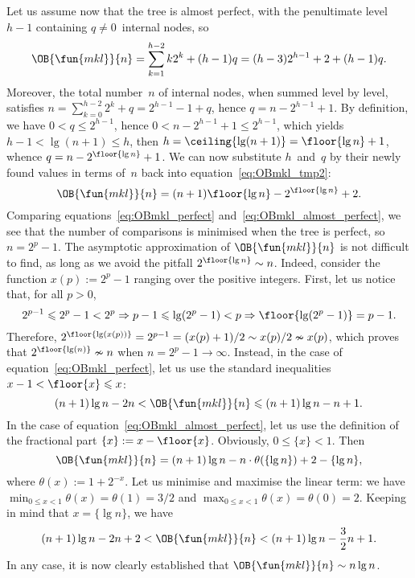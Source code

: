 Let us assume now that the tree is almost perfect, with the
penultimate level \(h-1\) containing \(q \neq 0\)~internal nodes, so
\begin{equation}
\OB{\fun{mkl}}{n} = \sum_{k=1}^{h-2}k2^k + (h-1)q
= (h-3)2^{h-1} + 2 + (h-1)q.
\label{eq:OBmkl_tmp2}
\end{equation}
Moreover, the total number~\(n\) of internal nodes, when summed level
by level, satisfies \(n = \sum_{k=0}^{h-2}2^k + q = 2^{h-1} - 1 + q\),
hence \(q = n - 2^{h-1} + 1\). By definition, we have \(0 < q
\leqslant 2^{h-1}\), hence \(0 < n - 2^{h-1} + 1 \leqslant 2^{h-1}\),
which yields \(h - 1 < \lg(n+1) \leqslant h\), then \(h =
\ceiling{\lg(n+1)} = \floor{\lg n} + 1\), whence \(q = n -
2^{\floor{\lg n}} + 1\). We can now substitute \(h\)~and~\(q\) by
their newly found values in terms of~\(n\) back into
equation~\eqref{eq:OBmkl_tmp2}:
\begin{equation}
\OB{\fun{mkl}}{n} = (n+1)\floor{\lg n} - 2^{\floor{\lg n}} + 2.
\label{eq:OBmkl_almost_perfect}
\end{equation}
Comparing equations~\eqref{eq:OBmkl_perfect}
and~\eqref{eq:OBmkl_almost_perfect}, we see that the number of
comparisons is minimised when the tree is perfect, so \(n = 2^p -
1\). The asymptotic approximation of \(\OB{\fun{mkl}}{n}\) is not
difficult to find, as long as we avoid the pitfall \(2^{\floor{\lg n}}
\sim n\). Indeed, consider the function \(x(p) := 2^p - 1\) ranging
over the positive integers. First, let us notice that, for all
\(p>0\),
\begin{equation*}
2^{p-1} \leqslant 2^p - 1 < 2^p \Rightarrow p-1 \leqslant \lg(2^p-1) <
p \Rightarrow \floor{\lg(2^p-1)} = p-1.
\end{equation*}
Therefore, \(2^{\floor{\lg(x(p))}} = 2^{p-1} = (x(p)+1)/2 \sim x(p)/2
\nsim x(p)\), which proves that \(2^{\floor{\lg(n)}} \nsim n\) when
\(n=2^p-1 \rightarrow \infty\). Instead, in the case of
equation~\eqref{eq:OBmkl_perfect}, let us use the standard
inequalities \(x - 1 < \floor{x} \leqslant x\):
\begin{equation*}
(n+1)\lg n - 2n < \OB{\fun{mkl}}{n} \leqslant (n+1)\lg n - n + 1.
\end{equation*}
In the case of equation~\eqref{eq:OBmkl_almost_perfect}, let us use
the definition of the fractional part \(\{x\}
:= x - \floor{x}\). Obviously, \(0 \leqslant \{x\} < 1\). Then
\begin{equation*}
\OB{\fun{mkl}}{n} = (n+1)\lg n - n \cdot \theta(\{\lg n\})
                    + 2 - \{\lg n\},
\end{equation*}
where \(\theta(x) := 1 + 2^{-x}\). Let us minimise and maximise the
linear term: we have \(\min_{0 \leqslant x <
  1}\theta(x) = \theta(1) = 3/2\) and \(\max_{0 \leqslant x <
  1}\theta(x) = \theta(0) = 2\). Keeping in mind that \(x=\{\lg n\}\),
we have
\begin{equation*}
(n+1)\lg n - 2n + 2 < \OB{\fun{mkl}}{n} < (n+1)\lg n - \frac{3}{2}n + 1.
\end{equation*}
In any case, it is now clearly established that \(\OB{\fun{mkl}}{n}
\sim n\lg n\).


